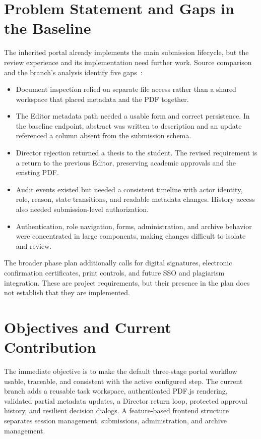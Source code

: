 \documentclass[11pt,a4paper]{report}
\begin{document}
\section{Problem Statement and Gaps in the Baseline}
The inherited portal already implements the main submission lifecycle, but the review experience and its implementation need further work. Source comparison and the branch's analysis identify five gaps~\cite{ui-report,refactoring}:
\begin{itemize}
  \item Document inspection relied on separate file access rather than a shared workspace that placed metadata and the PDF together.
  \item The Editor metadata path needed a usable form and correct persistence. In the baseline endpoint, abstract was written to description and an update referenced a column absent from the submission schema.
  \item Director rejection returned a thesis to the student. The revised requirement is a return to the previous Editor, preserving academic approvals and the existing PDF.
  \item Audit events existed but needed a consistent timeline with actor identity, role, reason, state transitions, and readable metadata changes. History access also needed submission-level authorization.
  \item Authentication, role navigation, forms, administration, and archive behavior were concentrated in large components, making changes difficult to isolate and review.
\end{itemize}

The broader phase plan additionally calls for digital signatures, electronic confirmation certificates, print controls, and future SSO and plagiarism integration. These are project requirements, but their presence in the plan does not establish that they are implemented.

\section{Objectives and Current Contribution}
The immediate objective is to make the default three-stage portal workflow usable, traceable, and consistent with the active configured step. The current branch adds a reusable task workspace, authenticated PDF.js rendering, validated partial metadata updates, a Director return loop, protected approval history, and resilient decision dialogs. A feature-based frontend structure separates session management, submissions, administration, and archive management.
\end{document}

